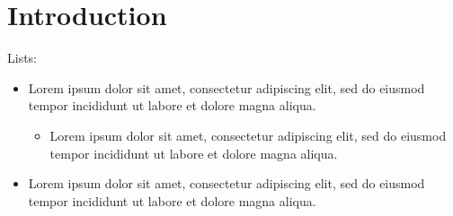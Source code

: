 \documentclass{article}
\begin{document}
\section{Introduction}
Lists:

\begin{itemize}[align=left, labelindent=0em, leftmargin=0em, itemindent=!, nosep, noitemsep]
    \item Lorem ipsum dolor sit amet, consectetur adipiscing elit, sed do eiusmod tempor incididunt ut labore et dolore magna aliqua.
    \begin{itemize}[nosep, noitemsep]
        \item Lorem ipsum dolor sit amet, consectetur adipiscing elit, sed do eiusmod tempor incididunt ut labore et dolore magna aliqua.
    \end{itemize}
    \item Lorem ipsum dolor sit amet, consectetur adipiscing elit, sed do eiusmod tempor incididunt ut labore et dolore magna aliqua.
\end{itemize}
\end{document}
